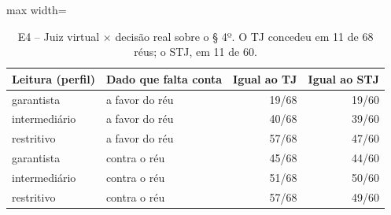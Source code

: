 \begin{table}[h]
\centering\small
\caption{E4 -- Juiz virtual $\times$ decisão real sobre o § 4º. O TJ concedeu em 11 de 68 réus; o STJ, em 11 de 60.}
\label{tab:e4}
\begin{adjustbox}{max width=\textwidth}
\begin{tabular}{llrr}
\toprule
Leitura (perfil) & Dado que falta conta & Igual ao TJ & Igual ao STJ \\
\midrule
garantista & a favor do réu & 19/68 & 19/60 \\
intermediário & a favor do réu & 40/68 & 39/60 \\
restritivo & a favor do réu & 57/68 & 47/60 \\
garantista & contra o réu & 45/68 & 44/60 \\
intermediário & contra o réu & 51/68 & 50/60 \\
restritivo & contra o réu & 57/68 & 49/60 \\
\bottomrule
\end{tabular}
\end{adjustbox}
\end{table}
